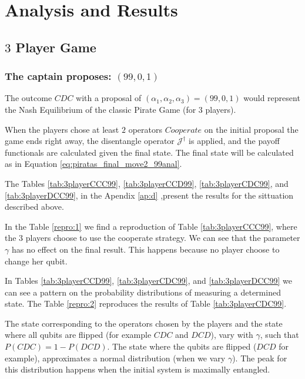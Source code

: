 \section{Analysis and Results}
\label{sec:description_3}


\subsection{$3$ Player Game}
\label{subsec:3playergame}

\subsubsection{The captain proposes: $(99, 0, 1)$}
\label{subsubsec:3playergame99}

The outcome $CDC$ with a proposal of $(\alpha_{1}, \alpha_{2}, \alpha_{3}) =(99, 0, 1)$ would represent the Nash Equilibrium of the classic Pirate Game (for $3$ players). 

When the players chose at least $2$ operators $Cooperate$ on the initial proposal the game ends right away, the disentangle operator $\mathcal{J}^{\dagger}$ is applied, and the payoff functionals are calculated given the final state. The final state will be calculated as in Equation \ref{eq:piratas_final_move2_99anal}. 

The Tables \ref{tab:3playerCCC99}, \ref{tab:3playerCCD99}, \ref{tab:3playerCDC99}, and \ref{tab:3playerDCC99}, in the Apendix \ref{ap:d}
,present the results for the sittuation described above.

In the Table \ref{repro:1} we find a reproduction of Table \ref{tab:3playerCCC99}, where the $3$ players choose to use the cooperate strategy. We can see that the parameter $\gamma$ has no effect on the final result. This happens because no player choose to change her qubit. 

In Tables \ref{tab:3playerCCD99}, \ref{tab:3playerCDC99}, and \ref{tab:3playerDCC99} we can see a pattern on the probability distributions of measuring a determined state. The Table \ref{repro:2} reproduces the results of Table \ref{tab:3playerCDC99}. 

The state corresponding to the operators chosen by the players and the state where all qubits are flipped (for example $CDC$ and $DCD$), vary with $\gamma$, such that $P(CDC)= 1 - P(DCD)$. The state where the qubits are flipped ($DCD$ for example), approximates a normal distribution (when we vary $\gamma$). The peak for this distribution happens when the initial system is maximally entangled.

